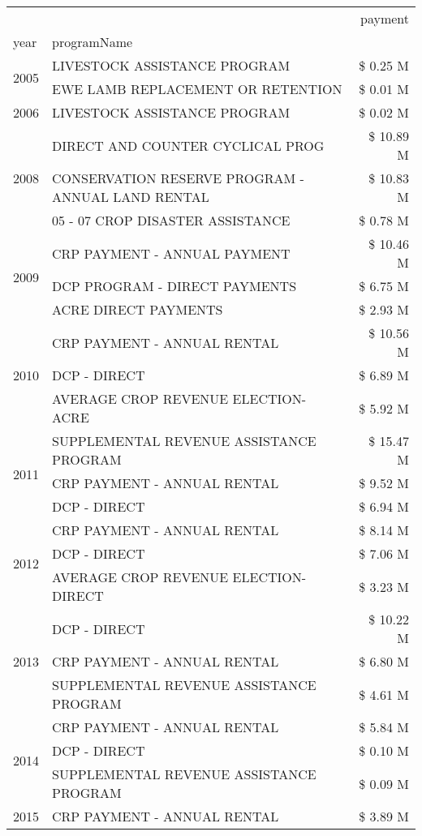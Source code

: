 \begin{tabular}{llr}
\toprule
 &  & payment \\
year & programName &  \\
\midrule
\multirow[t]{2}{*}{2005} & LIVESTOCK ASSISTANCE PROGRAM & \$ 0.25 M \\
 & EWE LAMB REPLACEMENT OR RETENTION & \$ 0.01 M \\
\cline{1-3}
2006 & LIVESTOCK ASSISTANCE PROGRAM & \$ 0.02 M \\
\cline{1-3}
\multirow[t]{3}{*}{2008} & DIRECT AND COUNTER CYCLICAL PROG & \$ 10.89 M \\
 & CONSERVATION RESERVE PROGRAM - ANNUAL LAND RENTAL & \$ 10.83 M \\
 & 05 - 07 CROP DISASTER ASSISTANCE & \$ 0.78 M \\
\cline{1-3}
\multirow[t]{3}{*}{2009} & CRP PAYMENT - ANNUAL PAYMENT & \$ 10.46 M \\
 & DCP PROGRAM - DIRECT PAYMENTS & \$ 6.75 M \\
 & ACRE DIRECT PAYMENTS & \$ 2.93 M \\
\cline{1-3}
\multirow[t]{3}{*}{2010} & CRP PAYMENT - ANNUAL RENTAL & \$ 10.56 M \\
 & DCP - DIRECT & \$ 6.89 M \\
 & AVERAGE CROP REVENUE ELECTION-ACRE & \$ 5.92 M \\
\cline{1-3}
\multirow[t]{3}{*}{2011} & SUPPLEMENTAL REVENUE ASSISTANCE PROGRAM & \$ 15.47 M \\
 & CRP PAYMENT - ANNUAL RENTAL & \$ 9.52 M \\
 & DCP - DIRECT & \$ 6.94 M \\
\cline{1-3}
\multirow[t]{3}{*}{2012} & CRP PAYMENT - ANNUAL RENTAL & \$ 8.14 M \\
 & DCP - DIRECT & \$ 7.06 M \\
 & AVERAGE CROP REVENUE ELECTION-DIRECT & \$ 3.23 M \\
\cline{1-3}
\multirow[t]{3}{*}{2013} & DCP - DIRECT & \$ 10.22 M \\
 & CRP PAYMENT - ANNUAL RENTAL & \$ 6.80 M \\
 & SUPPLEMENTAL REVENUE ASSISTANCE PROGRAM & \$ 4.61 M \\
\cline{1-3}
\multirow[t]{3}{*}{2014} & CRP PAYMENT - ANNUAL RENTAL & \$ 5.84 M \\
 & DCP - DIRECT & \$ 0.10 M \\
 & SUPPLEMENTAL REVENUE ASSISTANCE PROGRAM & \$ 0.09 M \\
\cline{1-3}
\multirow[t]{3}{*}{2015} & CRP PAYMENT - ANNUAL RENTAL & \$ 3.89 M \\

\end{tabular}
